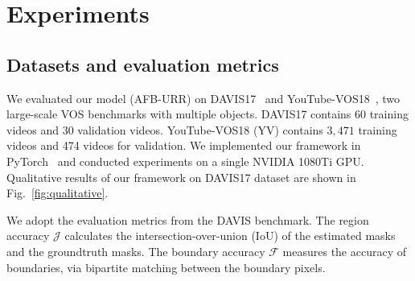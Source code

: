 \documentclass{article}
\begin{document}
\section{Experiments}

\subsection{Datasets and evaluation metrics}

We evaluated our model (AFB-URR) on DAVIS17~\cite{pont-tuset_2017_2018} and YouTube-VOS18~\cite{xu_youtube-vos_2018}, two large-scale VOS benchmarks with multiple objects.
DAVIS17 contains 60 training videos and 30 validation videos.
YouTube-VOS18 (YV) contains $3,471$ training videos and 474 videos for validation.
We implemented our framework in PyTorch~\cite{paszke2017automatic} and conducted experiments on a single NVIDIA 1080Ti GPU.
Qualitative results of our framework on DAVIS17 dataset are shown in Fig.~\ref{fig:qualitative}.

We adopt the evaluation metrics from the DAVIS benchmark.
The region accuracy $\mathcal{J}$ calculates the intersection-over-union (IoU) of the estimated masks and the groundtruth masks.
The boundary accuracy $\mathcal{F}$ measures the accuracy of boundaries, via bipartite matching between the boundary pixels.
\end{document}
